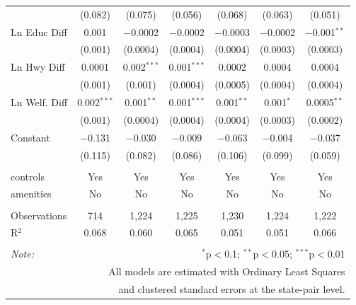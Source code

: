 \begin{table}[!htbp]
\begin{tabular}{@{\extracolsep{5pt}}lcccccc}
  & (0.082) & (0.075) & (0.056) & (0.068) & (0.063) & (0.051) \\ 
  Ln Educ Diff & 0.001 & $-$0.0002 & $-$0.0002 & $-$0.0003 & $-$0.0002 & $-$0.001$^{**}$ \\ 
  & (0.001) & (0.0004) & (0.0004) & (0.0004) & (0.0003) & (0.0003) \\ 
  Ln Hwy Diff & 0.0001 & 0.002$^{***}$ & 0.001$^{***}$ & 0.0002 & 0.0004 & 0.0004 \\ 
  & (0.001) & (0.001) & (0.0004) & (0.0005) & (0.0004) & (0.0004) \\ 
  Ln Welf. Diff & 0.002$^{***}$ & 0.001$^{**}$ & 0.001$^{***}$ & 0.001$^{**}$ & 0.001$^{*}$ & 0.0005$^{**}$ \\ 
  & (0.001) & (0.0004) & (0.0004) & (0.0004) & (0.0003) & (0.0002) \\ 
  Constant & $-$0.131 & $-$0.030 & $-$0.009 & $-$0.063 & $-$0.004 & $-$0.037 \\ 
  & (0.115) & (0.082) & (0.086) & (0.106) & (0.099) & (0.059) \\ 
 \hline \\[-1.8ex] 
controls & Yes & Yes & Yes & Yes & Yes & Yes \\ 
amenities & No & No & No & No & No & No \\ 
\hline \\[-1.8ex] 
Observations & 714 & 1,224 & 1,225 & 1,230 & 1,224 & 1,222 \\ 
R$^{2}$ & 0.068 & 0.060 & 0.065 & 0.051 & 0.051 & 0.066 \\ 
\hline 
\hline \\[-1.8ex] 
\textit{Note:}  & \multicolumn{6}{r}{$^{*}$p$<$0.1; $^{**}$p$<$0.05; $^{***}$p$<$0.01} \\ 
 & \multicolumn{6}{r}{All models are estimated with Ordinary Least Squares} \\ 
 & \multicolumn{6}{r}{and clustered standard errors at the state-pair level.} \\ 
\end{tabular} 
\end{table} 
